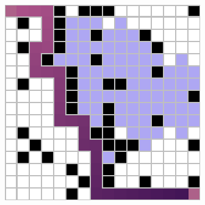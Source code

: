 \documentclass[letter]{article}
\begin{document}
\begin{questions}
\begin{figure}
		\caption{}\label{fig:q2-2}
		\endminipage\hfill
		\includegraphics[width=\linewidth]{../pics/16/DFS IDDFS 2573 33 34.png}
		\caption{}\label{fig:q2-3}
		\endminipage
	\end{figure}


\end{questions}
\end{document}
